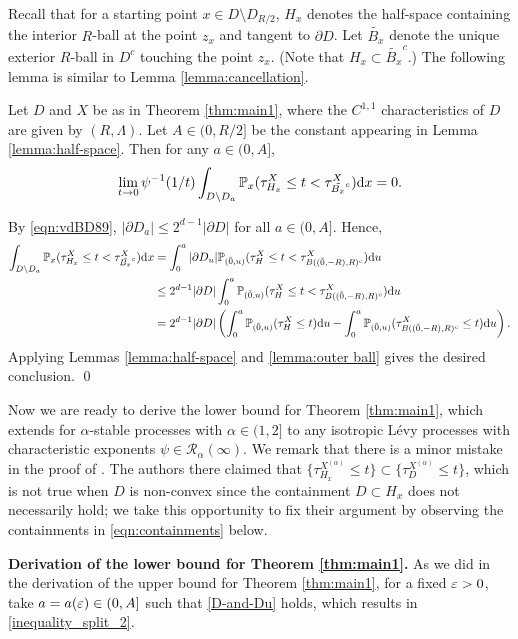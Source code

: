 \documentclass[11pt]{article}
\begin{document}
\begin{doublespace}
Recall that for a starting point $x\in D\setminus D_{R/2}$, $H_{x}$ denotes the half-space containing the interior $R$-ball at the point $z_x$ and tangent to $\partial D$. Let $\tilde{B_x}$ denote the unique exterior $R$-ball in $D^{c}$ touching the point $z_x$. (Note that $H_x\subset \tilde{B_x}^{c}$.) 
The following lemma is similar to Lemma \ref{lemma:cancellation}.


\begin{lemma}\label{lemma:cancellation2}
Let $D$ and $X$ be as in Theorem \ref{thm:main1}, where the $C^{1,1}$ characteristics of $D$ are given by $(R,\Lambda)$. 
Let $A\in(0,R/2]$ be the constant appearing in Lemma \ref{lemma:half-space}.
Then for any $a\in(0, A ]$,
\[
\lim_{t\to 0}\psi^{-1}(1/t)\int_{D\setminus D_{a}}{\mathbb P}_{x}(\tau_{H_x}^{X}\leq t <\tau_{\tilde{B_x}^{c}}^{X} )\mathrm{d} x=0. 
\]
\end{lemma}
\pf
By \eqref{eqn:vdBD89},
$|\partial D_{a}|\leq 2^{d-1}|\partial D|$ for all $a\in(0,A]$. Hence,
\begin{align*}
\int_{D\setminus D_{a}}{\mathbb P}_{x}(\tau_{H_x}^{X}\leq t <\tau_{\tilde{B_x}^{c}}^{X} )\mathrm{d} x
&=\int_0^{a} |\partial D_u| {\mathbb P}_{(\tilde{0},u)} (\tau_{H}^{X}\leq t <\tau_{B((\tilde{0},-R),R)^{c}}^{X} )\mathrm{d} u\\
&\le 2^{d-1} |\partial D|\int_0^{a} {\mathbb P}_{(\tilde{0},u)} (\tau_{H}^{X}\leq t <\tau_{B((\tilde{0},-R),R)^{c}}^{X} )\mathrm{d} u\\
&= 2^{d-1} |\partial D|\left(\int_0^{a} {\mathbb P}_{(\tilde{0},u)} (\tau_{H}^{X}\leq t)\mathrm{d} u -\int_0^{a} {\mathbb P}_{(\tilde{0},u)} (\tau_{B((\tilde{0},-R),R)^{c}}^{X} \le t)\mathrm{d} u\right).
\end{align*}
Applying Lemmas \ref{lemma:half-space} and \ref{lemma:outer ball} gives the desired conclusion.  
\qed



Now we are ready to derive the lower bound for Theorem \ref{thm:main1}, which extends \cite[Lemma 3.1]{PS22} for $\alpha$-stable processes with $\alpha\in (1,2]$ to any isotropic L\'evy processes with characteristic exponents $\psi\in \mathcal{R}_{\alpha}(\infty)$.
We remark that there is a minor mistake in the proof of \cite[Lemma 3.1]{PS22}. 
The authors there claimed that $\{\tau_{H_{x}}^{X^{(\alpha)}}\leq t\}\subset \{\tau_{D}^{X^{(\alpha)}}\leq t\}$, which is not true when $D$ is non-convex since the containment $D\subset H_x$ does not necessarily hold; 
we take this opportunity to fix their argument by observing the containments in \eqref{eqn:containments} below.
\bigskip


\noindent
\textbf{Derivation of the lower bound for Theorem \ref{thm:main1}.}
As we did in the derivation of the upper bound for Theorem \ref{thm:main1}, for a fixed $\varepsilon>0$, take $a=a(\varepsilon)\in(0, A ]$ such that \eqref{D-and-Du} holds, which results in \eqref{inequality_split_2}. 


\end{doublespace}
\end{document}
